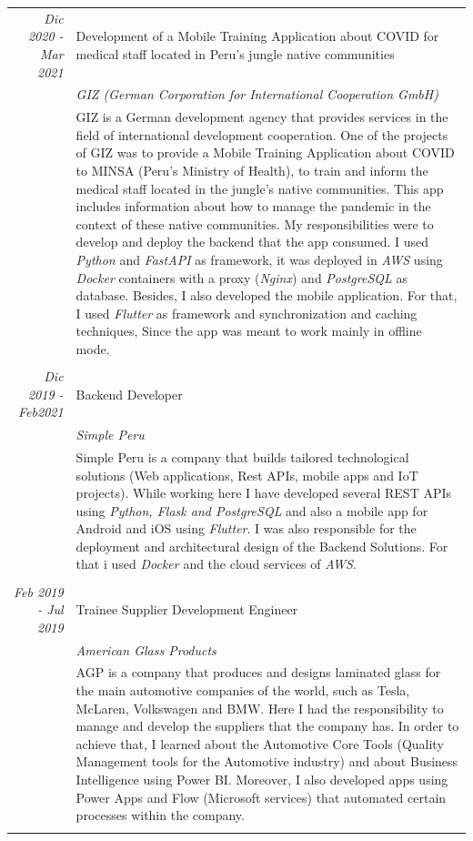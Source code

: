 \documentclass[a4paper,10pt]{article}
\begin{document}
\begin{longtable}{r|p{11cm}}
  \emph{Dic 2020 - Mar 2021} & Development of a Mobile Training Application about COVID for medical staff located in Peru's jungle native communities\\& \emph{GIZ (German Corporation for International Cooperation GmbH)}\\ & \footnotesize{GIZ is a German development agency that provides services in the field of international development cooperation. One of the projects of GIZ was to provide a Mobile Training Application about COVID to MINSA (Peru's Ministry of Health), to train and inform the medical staff located in the jungle's native communities. This app includes information about how to manage the pandemic in the context of these native communities. My responsibilities were to develop and deploy the backend that the app consumed. I used \emph{Python} and \emph{FastAPI} as framework, it was deployed in \emph{AWS} using \emph{Docker} containers with a proxy (\emph{Nginx}) and \emph{PostgreSQL} as database. Besides, I also developed the mobile application. For that, I used \emph{Flutter} as framework and synchronization and caching techniques, Since the app was meant to work mainly in offline mode.}\\&\\
  \emph{Dic 2019 - Feb2021} & Backend Developer \\&\emph{Simple Peru}\\&\footnotesize{Simple Peru is a company that builds tailored technological solutions (Web applications, Rest APIs, mobile apps and IoT projects). While working here I have developed several REST APIs using \emph{Python, Flask and PostgreSQL} and also a mobile app for Android and iOS using \emph{Flutter}. I was also responsible for the deployment and architectural design of the Backend Solutions. For that i used \emph{Docker} and the cloud services of \emph{AWS}.}\\&\\
  \emph{Feb 2019 - Jul 2019} & Trainee Supplier Development Engineer \\&\emph{American Glass Products}\\&\footnotesize{AGP is a company that produces and designs laminated glass for the main automotive companies of the world, such as Tesla, McLaren, Volkswagen and BMW. Here I had the responsibility to manage and develop the suppliers that the company has. In order to achieve that,  I learned about the Automotive Core Tools (Quality Management tools for the Automotive industry) and about Business Intelligence using Power BI. Moreover, I also developed apps using Power Apps and Flow (Microsoft services)  that automated certain processes within the company.}\\&\\

\end{longtable}
\end{document}

